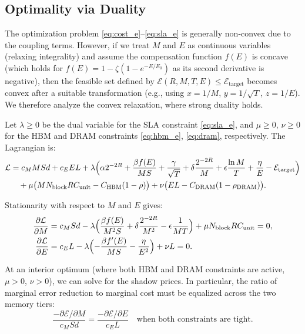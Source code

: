 \documentclass[11pt,a4paper]{article}
\theoremstyle{plain}
\theoremstyle{definition}
\begin{document}
\subsection{Optimality via Duality}
The optimization problem \eqref{eq:cost_e}--\eqref{eq:sla_e} is generally non-convex due to the coupling terms. However, if we treat $M$ and $E$ as continuous variables (relaxing integrality) and assume the compensation function $f(E)$ is concave (which holds for $f(E)=1-\zeta(1-e^{-E/E_0})$ as its second derivative is negative), then the feasible set defined by $\mathcal{E}(R,M,T,E)\le\mathcal{E}_{\text{target}}$ becomes convex after a suitable transformation (e.g., using $x=1/M$, $y=1/\sqrt{T}$, $z=1/E$). We therefore analyze the convex relaxation, where strong duality holds.

Let $\lambda\ge0$ be the dual variable for the SLA constraint \eqref{eq:sla_e}, and $\mu\ge0$, $\nu\ge0$ for the HBM and DRAM constraints \eqref{eq:hbm_e}, \eqref{eq:dram}, respectively. The Lagrangian is:
\begin{align*}
\mathcal{L} &= c_M M S d + c_E E L + \lambda\Bigl(\alpha 2^{-2R} + \frac{\beta f(E)}{MS} + \frac{\gamma}{\sqrt{T}} + \delta\frac{2^{-2R}}{M} + \epsilon\frac{\ln M}{T} + \frac{\eta}{E} - \mathcal{E}_{\text{target}}\Bigr) \\
&\quad + \mu\bigl(M N_{\text{block}} R C_{\text{unit}} - C_{\text{HBM}}(1-\rho)\bigr) + \nu\bigl(E L - C_{\text{DRAM}}(1-\rho_{\text{DRAM}})\bigr).
\end{align*}

Stationarity with respect to $M$ and $E$ gives:
\begin{align}
\frac{\partial \mathcal{L}}{\partial M} &= c_M S d - \lambda\Bigl(\frac{\beta f(E)}{M^2 S} + \delta\frac{2^{-2R}}{M^2} - \epsilon\frac{1}{M T}\Bigr) + \mu N_{\text{block}} R C_{\text{unit}} = 0, \label{eq:kkt_m}\\
\frac{\partial \mathcal{L}}{\partial E} &= c_E L - \lambda\Bigl(-\frac{\beta f'(E)}{M S} - \frac{\eta}{E^2}\Bigr) + \nu L = 0. \label{eq:kkt_e}
\end{align}

At an interior optimum (where both HBM and DRAM constraints are active, $\mu>0$, $\nu>0$), we can solve for the shadow prices. In particular, the ratio of marginal error reduction to marginal cost must be equalized across the two memory tiers:
\begin{equation}
\frac{-\partial \mathcal{E}/\partial M}{c_M S d} = \frac{-\partial \mathcal{E}/\partial E}{c_E L} \quad \text{when both constraints are tight}. \label{eq:marginal}
\end{equation}
\end{document}
